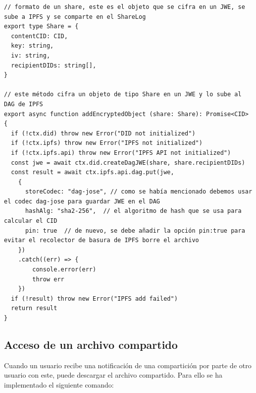 \begin{verbatim}
// formato de un share, este es el objeto que se cifra en un JWE, se sube a IPFS y se comparte en el ShareLog
export type Share = {
  contentCID: CID,
  key: string,
  iv: string,
  recipientDIDs: string[],
}

// este método cifra un objeto de tipo Share en un JWE y lo sube al DAG de IPFS
export async function addEncryptedObject (share: Share): Promise<CID> {
  if (!ctx.did) throw new Error("DID not initialized")
  if (!ctx.ipfs) throw new Error("IPFS not initialized")
  if (!ctx.ipfs.api) throw new Error("IPFS API not initialized")
  const jwe = await ctx.did.createDagJWE(share, share.recipientDIDs)
  const result = await ctx.ipfs.api.dag.put(jwe, 
    {
      storeCodec: "dag-jose", // como se había mencionado debemos usar el codec dag-jose para guardar JWE en el DAG
      hashAlg: "sha2-256",  // el algoritmo de hash que se usa para calcular el CID
      pin: true  // de nuevo, se debe añadir la opción pin:true para evitar el recolector de basura de IPFS borre el archivo
    })
    .catch((err) => {
        console.error(err)
        throw err
    })
  if (!result) throw new Error("IPFS add failed")
  return result
}
\end{verbatim}

\subsection{Acceso de un archivo compartido}
Cuando un usuario recibe una notificación de una compartición por parte de otro usuario con este, puede descargar el archivo compartido. Para ello se ha implementado el siguiente comando:

